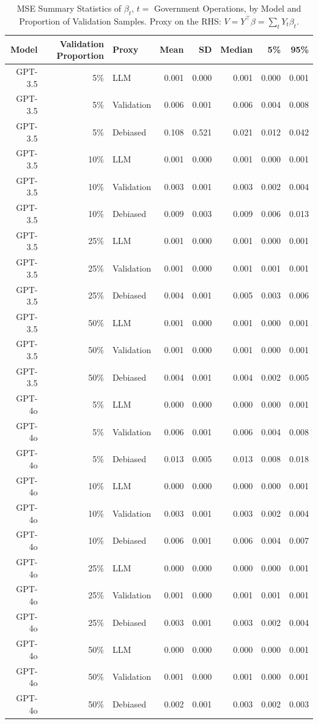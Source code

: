 \begin{table}

\caption{MSE Summary Statistics of $\beta_{t}$, $t=$ Government Operations, by Model and Proportion of Validation Samples. Proxy on the RHS: $V = Y^\top \beta = \sum_{t} Y_t \beta_t$.}
\centering
\begin{tabular}[t]{rrlrrrrr}
\toprule
Model & Validation Proportion & Proxy & Mean & SD & Median & 5\% & 95\%\\
\midrule
GPT-3.5 & 5\% & LLM & 0.001 & 0.000 & 0.001 & 0.000 & 0.001\\
GPT-3.5 & 5\% & Validation & 0.006 & 0.001 & 0.006 & 0.004 & 0.008\\
GPT-3.5 & 5\% & Debiased & 0.108 & 0.521 & 0.021 & 0.012 & 0.042\\
GPT-3.5 & 10\% & LLM & 0.001 & 0.000 & 0.001 & 0.000 & 0.001\\
GPT-3.5 & 10\% & Validation & 0.003 & 0.001 & 0.003 & 0.002 & 0.004\\
GPT-3.5 & 10\% & Debiased & 0.009 & 0.003 & 0.009 & 0.006 & 0.013\\
GPT-3.5 & 25\% & LLM & 0.001 & 0.000 & 0.001 & 0.000 & 0.001\\
GPT-3.5 & 25\% & Validation & 0.001 & 0.000 & 0.001 & 0.001 & 0.001\\
GPT-3.5 & 25\% & Debiased & 0.004 & 0.001 & 0.005 & 0.003 & 0.006\\
GPT-3.5 & 50\% & LLM & 0.001 & 0.000 & 0.001 & 0.000 & 0.001\\
GPT-3.5 & 50\% & Validation & 0.001 & 0.000 & 0.001 & 0.000 & 0.001\\
GPT-3.5 & 50\% & Debiased & 0.004 & 0.001 & 0.004 & 0.002 & 0.005\\
GPT-4o & 5\% & LLM & 0.000 & 0.000 & 0.000 & 0.000 & 0.001\\
GPT-4o & 5\% & Validation & 0.006 & 0.001 & 0.006 & 0.004 & 0.008\\
GPT-4o & 5\% & Debiased & 0.013 & 0.005 & 0.013 & 0.008 & 0.018\\
GPT-4o & 10\% & LLM & 0.000 & 0.000 & 0.000 & 0.000 & 0.001\\
GPT-4o & 10\% & Validation & 0.003 & 0.001 & 0.003 & 0.002 & 0.004\\
GPT-4o & 10\% & Debiased & 0.006 & 0.001 & 0.006 & 0.004 & 0.007\\
GPT-4o & 25\% & LLM & 0.000 & 0.000 & 0.000 & 0.000 & 0.001\\
GPT-4o & 25\% & Validation & 0.001 & 0.000 & 0.001 & 0.001 & 0.001\\
GPT-4o & 25\% & Debiased & 0.003 & 0.001 & 0.003 & 0.002 & 0.004\\
GPT-4o & 50\% & LLM & 0.000 & 0.000 & 0.000 & 0.000 & 0.001\\
GPT-4o & 50\% & Validation & 0.001 & 0.000 & 0.001 & 0.000 & 0.001\\
GPT-4o & 50\% & Debiased & 0.002 & 0.001 & 0.003 & 0.002 & 0.003\\
\bottomrule
\end{tabular}
\end{table}
